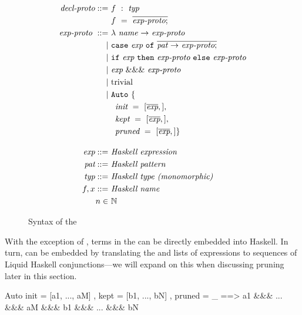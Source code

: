 \begin{figure}
\begin{align*}
  \textit{decl-proto} ::= &
  ~ f ~ : ~ \textit{typ} \\ &
  ~ f ~ = ~ \overline{\textit{exp-proto} ;}
  \\
  \textit{exp-proto}~ ::= &
    ~ \mathtt{\lambda} ~ \textit{name} ~ \mathtt{\rightarrow} ~ \textit{exp-proto} \\ \mid &
    ~ \mathtt{case} ~ \textit{exp} ~ \mathtt{of} ~ \overline{\textit{pat} ~ \mathtt{\rightarrow} ~ \textit{exp-proto} ;} \\ \mid &
    ~ \mathtt{if} ~ \textit{exp} ~ \mathtt{then} ~ \textit{exp-proto} ~ \mathtt{else} ~ \textit{exp-proto} \\ \mid &
    ~ \textit{exp} ~ \&\&\& ~ \textit{exp-proto} \\ \mid &
    ~ \text{trivial} \\ \mid &
    ~ \mathtt{Auto} ~ \{ \\ &
    ~ \hspace{0.5em} \textit{init}~=~[\overline{\textit{exp}},], \\ &
    ~ \hspace{0.5em} \textit{kept}~=~[\overline{\textit{exp}},], \\ &
    ~ \hspace{0.5em} \textit{pruned}~=~[\overline{\textit{exp}},] \} 
  \\[1em]
  \textit{exp} ::= & ~ \textit{Haskell expression} 
  \\
  \textit{pat} ::= & ~ \textit{Haskell pattern} 
  \\
  \textit{typ} ::= & ~ \textit{Haskell type (monomorphic)} 
  \\
  f, x ::= & ~ \textit{Haskell name} 
  \\
  n \in & ~ \mathbb{N}
\end{align*}
\caption{Syntax of the \LangB}
\label{fig:langb-syntax}
\end{figure}

With the exception of , terms in the \LangB can be directly
embedded into Haskell. In turn,  can be embedded by
translating the  and  lists of expressions to
sequences of Liquid Haskell conjunctions---we will expand on this when
discussing pruning later in this section.
\begin{code}
  Auto { init = [a1, ..., aM]
       , kept = [b1, ..., bN]
       , pruned = _ } ==>
  a1 &&& ... &&& aM &&& b1 &&& ... &&& bN
\end{code}


